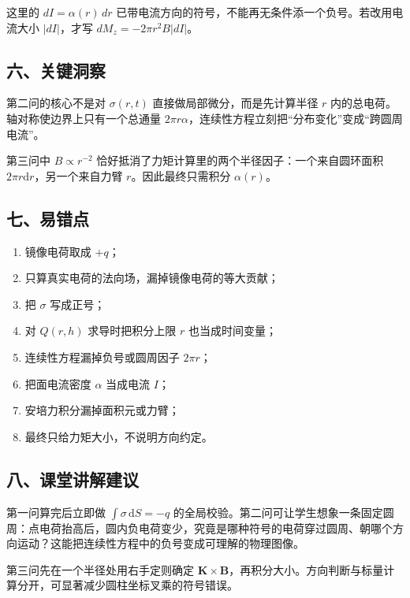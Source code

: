 \documentclass[12pt,a4paper,UTF8]{ctexart}
\newcommand{\tightlist}{\setlength{\itemsep}{0pt}\setlength{\parskip}{0pt}}
\begin{document}
这里的 \(dI=\alpha(r)\,dr\)
已带电流方向的符号，不能再无条件添一个负号。若改用电流大小
\(|dI|\)，才写 \(dM_z=-2\pi r^2B|dI|\)。

\subsection{六、关键洞察}\label{ux516dux5173ux952eux6d1eux5bdf-6}

第二问的核心不是对 \(\sigma(r,t)\) 直接做局部微分，而是先计算半径 \(r\)
内的总电荷。轴对称使边界上只有一个总通量
\(2\pi r\alpha\)，连续性方程立刻把``分布变化''变成``跨圆周电流''。

第三问中 \(B\propto r^{-2}\)
恰好抵消了力矩计算里的两个半径因子：一个来自圆环面积
\(2\pi r\mathrm dr\)，另一个来自力臂 \(r\)。因此最终只需积分
\(\alpha(r)\)。

\subsection{七、易错点}\label{ux4e03ux6613ux9519ux70b9-6}

\begin{enumerate}
\def\labelenumi{\arabic{enumi}.}
\tightlist
\item
  镜像电荷取成 \(+q\)；
\item
  只算真实电荷的法向场，漏掉镜像电荷的等大贡献；
\item
  把 \(\sigma\) 写成正号；
\item
  对 \(Q(r,h)\) 求导时把积分上限 \(r\) 也当成时间变量；
\item
  连续性方程漏掉负号或圆周因子 \(2\pi r\)；
\item
  把面电流密度 \(\alpha\) 当成电流 \(I\)；
\item
  安培力积分漏掉面积元或力臂；
\item
  最终只给力矩大小，不说明方向约定。
\end{enumerate}

\subsection{八、课堂讲解建议}\label{ux516bux8bfeux5802ux8bb2ux89e3ux5efaux8bae-6}

第一问算完后立即做 \(\int\sigma\,\mathrm dS=-q\)
的全局校验。第二问可让学生想象一条固定圆周：点电荷抬高后，圆内负电荷变少，究竟是哪种符号的电荷穿过圆周、朝哪个方向运动？这能把连续性方程中的负号变成可理解的物理图像。

第三问先在一个半径处用右手定则确定
\(\bm K\times\bm B\)，再积分大小。方向判断与标量计算分开，可显著减少圆柱坐标叉乘的符号错误。
\end{document}
